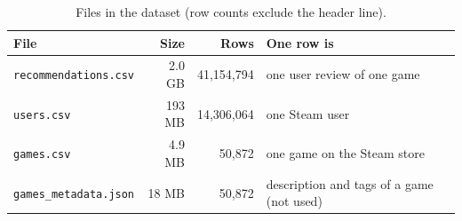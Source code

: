 \documentclass[11pt,a4paper]{article}
\newcommand{\code}[1]{\texttt{#1}}
\begin{document}
\begin{table}[H]\centering\small
\begin{tabular}{lrrl}
\toprule
File & Size & Rows & One row is \\
\midrule
\code{recommendations.csv} & 2.0 GB & 41,154,794 & one user review of one game \\
\code{users.csv}           & 193 MB & 14,306,064 & one Steam user \\
\code{games.csv}           & 4.9 MB & 50,872     & one game on the Steam store \\
\code{games\_metadata.json} & 18 MB & 50,872    & description and tags of a game (not used) \\
\bottomrule
\end{tabular}
\caption{Files in the dataset (row counts exclude the header line).}
\end{table}
\end{document}
